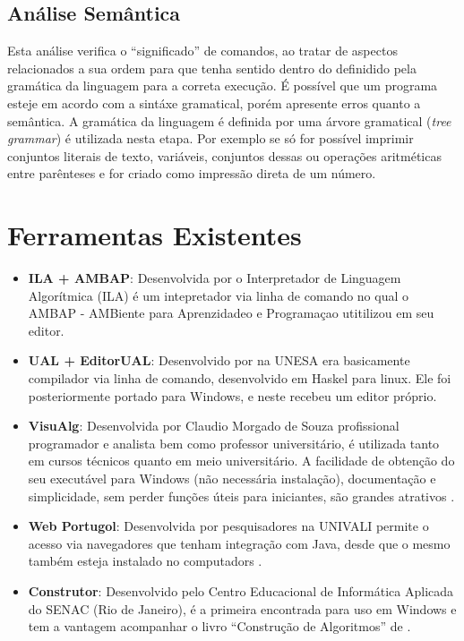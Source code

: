 \subsection{Análise Semântica}

Esta análise verifica o ``significado'' de comandos, ao tratar de aspectos relacionados a sua ordem para que tenha sentido dentro do definidido pela gramática da linguagem para a correta execução. É possível que um programa esteje em acordo com a sintáxe gramatical, porém apresente erros quanto a semântica. A gramática da linguagem é definida por uma árvore gramatical (\textit{tree grammar}) é utilizada nesta etapa. Por exemplo se só for possível imprimir conjuntos literais de texto, variáveis, conjuntos dessas ou operações aritméticas entre parênteses e for criado como impressão direta de um número.

\section{Ferramentas Existentes}

\begin{itemize}

\item \textbf{ILA + AMBAP}: Desenvolvida por  o Interpretador de Linguagem Algorítmica (ILA) é um intepretador via linha de comando no qual o AMBAP - AMBiente para Aprenzidadeo e Programaçao utitilizou em seu editor.

\item \textbf{UAL + EditorUAL}: Desenvolvido por  na UNESA era basicamente compilador via linha de comando, desenvolvido em Haskel para linux. Ele foi posteriormente portado para Windows, e neste recebeu um editor próprio.

\item \textbf{VisuAlg}: Desenvolvida por Claudio Morgado de Souza profissional programador e analista bem como professor universitário, é utilizada tanto em cursos técnicos quanto em meio universitário. A facilidade de obtenção do seu executável para Windows (não necessária instalação), documentação e simplicidade, sem perder funções úteis para iniciantes, são grandes atrativos \cite{souza2013etal}.

\item \textbf{Web Portugol}: Desenvolvida por pesquisadores na UNIVALI permite o acesso via navegadores que tenham integração com Java, desde que o mesmo também esteja instalado no computadors \cite{souza2013etal}.

\item \textbf{Construtor}: Desenvolvido pelo Centro Educacional de Informática Aplicada do SENAC (Rio de Janeiro), é a primeira encontrada para uso em Windows e tem a vantagem acompanhar o livro ``Construção de Algoritmos'' de .

\end{itemize}

